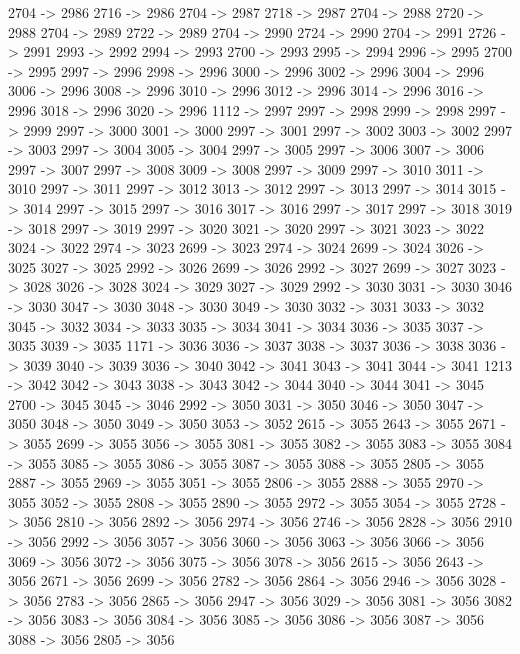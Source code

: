 {	2704 -> 2986
	2716 -> 2986
	2704 -> 2987
	2718 -> 2987
	2704 -> 2988
	2720 -> 2988
	2704 -> 2989
	2722 -> 2989
	2704 -> 2990
	2724 -> 2990
	2704 -> 2991
	2726 -> 2991
	2993 -> 2992
	2994 -> 2993
	2700 -> 2993
	2995 -> 2994
	2996 -> 2995
	2700 -> 2995
	2997 -> 2996
	2998 -> 2996
	3000 -> 2996
	3002 -> 2996
	3004 -> 2996
	3006 -> 2996
	3008 -> 2996
	3010 -> 2996
	3012 -> 2996
	3014 -> 2996
	3016 -> 2996
	3018 -> 2996
	3020 -> 2996
	1112 -> 2997
	2997 -> 2998
	2999 -> 2998
	2997 -> 2999
	2997 -> 3000
	3001 -> 3000
	2997 -> 3001
	2997 -> 3002
	3003 -> 3002
	2997 -> 3003
	2997 -> 3004
	3005 -> 3004
	2997 -> 3005
	2997 -> 3006
	3007 -> 3006
	2997 -> 3007
	2997 -> 3008
	3009 -> 3008
	2997 -> 3009
	2997 -> 3010
	3011 -> 3010
	2997 -> 3011
	2997 -> 3012
	3013 -> 3012
	2997 -> 3013
	2997 -> 3014
	3015 -> 3014
	2997 -> 3015
	2997 -> 3016
	3017 -> 3016
	2997 -> 3017
	2997 -> 3018
	3019 -> 3018
	2997 -> 3019
	2997 -> 3020
	3021 -> 3020
	2997 -> 3021
	3023 -> 3022
	3024 -> 3022
	2974 -> 3023
	2699 -> 3023
	2974 -> 3024
	2699 -> 3024
	3026 -> 3025
	3027 -> 3025
	2992 -> 3026
	2699 -> 3026
	2992 -> 3027
	2699 -> 3027
	3023 -> 3028
	3026 -> 3028
	3024 -> 3029
	3027 -> 3029
	2992 -> 3030
	3031 -> 3030
	3046 -> 3030
	3047 -> 3030
	3048 -> 3030
	3049 -> 3030
	3032 -> 3031
	3033 -> 3032
	3045 -> 3032
	3034 -> 3033
	3035 -> 3034
	3041 -> 3034
	3036 -> 3035
	3037 -> 3035
	3039 -> 3035
	1171 -> 3036
	3036 -> 3037
	3038 -> 3037
	3036 -> 3038
	3036 -> 3039
	3040 -> 3039
	3036 -> 3040
	3042 -> 3041
	3043 -> 3041
	3044 -> 3041
	1213 -> 3042
	3042 -> 3043
	3038 -> 3043
	3042 -> 3044
	3040 -> 3044
	3041 -> 3045
	2700 -> 3045
	3045 -> 3046
	2992 -> 3050
	3031 -> 3050
	3046 -> 3050
	3047 -> 3050
	3048 -> 3050
	3049 -> 3050
	3053 -> 3052
	2615 -> 3055
	2643 -> 3055
	2671 -> 3055
	2699 -> 3055
	3056 -> 3055
	3081 -> 3055
	3082 -> 3055
	3083 -> 3055
	3084 -> 3055
	3085 -> 3055
	3086 -> 3055
	3087 -> 3055
	3088 -> 3055
	2805 -> 3055
	2887 -> 3055
	2969 -> 3055
	3051 -> 3055
	2806 -> 3055
	2888 -> 3055
	2970 -> 3055
	3052 -> 3055
	2808 -> 3055
	2890 -> 3055
	2972 -> 3055
	3054 -> 3055
	2728 -> 3056
	2810 -> 3056
	2892 -> 3056
	2974 -> 3056
	2746 -> 3056
	2828 -> 3056
	2910 -> 3056
	2992 -> 3056
	3057 -> 3056
	3060 -> 3056
	3063 -> 3056
	3066 -> 3056
	3069 -> 3056
	3072 -> 3056
	3075 -> 3056
	3078 -> 3056
	2615 -> 3056
	2643 -> 3056
	2671 -> 3056
	2699 -> 3056
	2782 -> 3056
	2864 -> 3056
	2946 -> 3056
	3028 -> 3056
	2783 -> 3056
	2865 -> 3056
	2947 -> 3056
	3029 -> 3056
	3081 -> 3056
	3082 -> 3056
	3083 -> 3056
	3084 -> 3056
	3085 -> 3056
	3086 -> 3056
	3087 -> 3056
	3088 -> 3056
	2805 -> 3056
}
